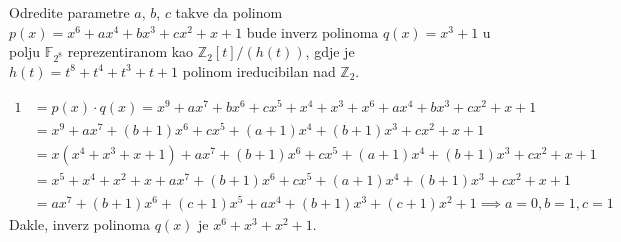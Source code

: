 \documentclass{exam}
\begin{document}
\begin{questions}
\begin{solution}
\end{solution}

\pagebreak

\question Odredite parametre $a$, $b$, $c$ takve da polinom $p(x) = x^6 + ax^4 + bx^3 + cx^2 + x + 1$ bude inverz polinoma $q(x) = x^3 + 1$ u polju $\mathbb{F}_{2^8}$ reprezentiranom kao $\mathbb{Z}_2[t]/(h(t))$, gdje je $h(t) = t^8 + t^4 + t^3 + t + 1$ polinom ireducibilan nad $\mathbb{Z}_2$.

\begin{solution}
  \begin{align*}
    1 &= p(x) \cdot q(x) = x^9 + ax^7 + bx^6 + cx^5 + x^4 + x^3 + x^6 + ax^4 + bx^3 + cx^2 + x + 1\\
    &= x^9 + ax^7 + (b + 1)x^6 + cx^5 + (a + 1)x^4 + (b + 1)x^3 + cx^2 + x + 1\\
    &= x(x^4 + x^3 + x + 1) + ax^7 + (b + 1)x^6 + cx^5 + (a + 1)x^4 + (b + 1)x^3 + cx^2 + x + 1\\
    &= x^5 + x^4 + x^2 + x + ax^7 + (b + 1)x^6 + cx^5 + (a + 1)x^4 + (b + 1)x^3 + cx^2 + x + 1\\
    &= ax^7 + (b + 1)x^6 + (c + 1)x^5 + ax^4 + (b + 1)x^3 + (c + 1)x^2 + 1 \implies a = 0, b = 1, c = 1
  \end{align*}
  Dakle, inverz polinoma $q(x)$ je $x^6 + x^3 + x^2 + 1$.
\end{solution}

\end{questions}
\end{document}
